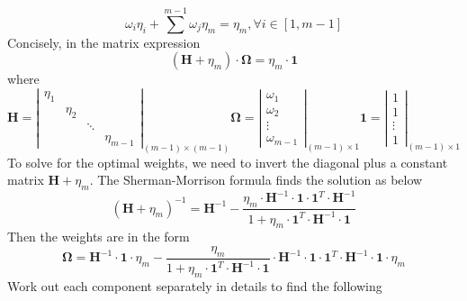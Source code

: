 \documentclass{article}
\begin{document}
\begin{equation}
    \omega_i \eta_i + \sum^{m - 1}{\omega_j} \eta_m = \eta_m, \forall i \in [1, m - 1]
\end{equation}
Concisely, in the matrix expression
\begin{equation}
    \left(\boldsymbol{H} + \eta_m\right) \cdot \boldsymbol{\Omega} = \eta_m \cdot \boldsymbol{1}
\end{equation}
where
\begin{equation}
    \boldsymbol{H} = \left| \begin{matrix} \eta_1 & & & \\ & \eta_2 & & \\ & & \ddots & \\ & & & \eta_{m- 1} \end{matrix} \right |_{(m - 1) \times (m - 1)} \boldsymbol{\Omega} = \left| \begin{matrix} \omega_1 \\ \omega_2 \\ \vdots \\ \omega_{m - 1} \end{matrix} \right|_{(m - 1) \times 1} \boldsymbol{1} = \left| \begin{matrix} 1 \\ 1 \\ \vdots \\ 1 \end{matrix} \right|_{(m - 1) \times 1} \nonumber
\end{equation}
To solve for the optimal weights, we need to invert the diagonal plus a constant matrix $ \boldsymbol{H} + \eta_m $. The Sherman-Morrison formula finds the solution as below
\begin{equation}
    \left( \boldsymbol{H} + \eta_m \right)^{-1} = \boldsymbol{H}^{-1} - \frac{\eta_m \cdot \boldsymbol{H}^{-1} \cdot \boldsymbol{1} \cdot \boldsymbol{1}^T \cdot \boldsymbol{H}^{-1}}{1 + \eta_m \cdot \boldsymbol{1}^{T} \cdot \boldsymbol{H}^{-1} \cdot \boldsymbol{1}}
\end{equation}
Then the weights are in the form
\begin{equation}
    \boldsymbol{\Omega} = \boldsymbol{H}^{-1} \cdot \boldsymbol{1} \cdot \eta_m - \frac{\eta_m}{1 + \eta_m \cdot \boldsymbol{1}^{T} \cdot \boldsymbol{H}^{-1} \cdot \boldsymbol{1}} \cdot \boldsymbol{H}^{-1} \cdot \boldsymbol{1} \cdot \boldsymbol{1}^{T} \cdot \boldsymbol{H}^{-1} \cdot \boldsymbol{1} \cdot \eta_m
\end{equation}
Work out each component separately in details to find the following
\end{document}
